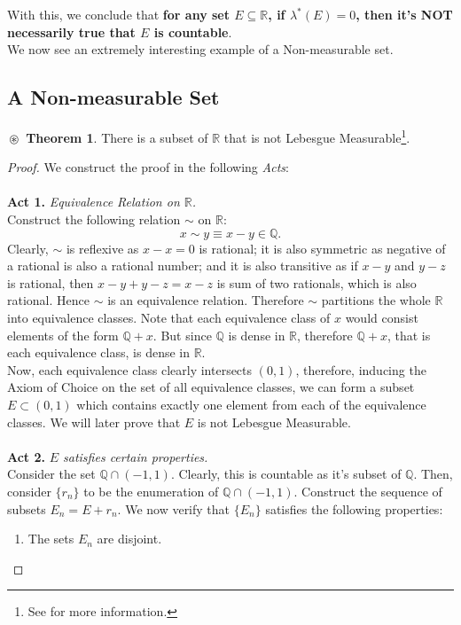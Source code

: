 \documentclass{article}
\theoremstyle{definition}
\newtheorem{theorem}{$\boxed{\boxed{\circledast}}$ Theorem}
\theoremstyle{remark}
\theoremstyle{definition}
\theoremstyle{definition}
\theoremstyle{definition}
\newcommand{\intrs}{\cap}
\newcommand{\R}{\mathbb{R}}
\newcommand{\Q}{\mathbb{Q}}
\newcommand{\lom}[1]{\lambda^*\left (#1\right )}
\begin{document}
With this, we conclude that \textbf{for any set $ E\subseteq \R $, if $ \lom{E} = 0 $, then it's NOT necessarily true that $ E $ is countable}.\\
We now see an extremely interesting example of a Non-measurable set.
\subsection{A Non-measurable Set}
\begin{theorem}
	 There is a subset of $ \R $ that is not Lebesgue Measurable\footnote{See \cite{Solovay70} for more information.}.
\end{theorem}
\begin{proof} We construct the proof in the following \emph{Acts}:\\\\
	\textbf{Act 1.} \emph{Equivalence Relation on $ \R $.}\\
	Construct the following relation $ \sim  $ on $ \R $:
	\[x\sim y \equiv x-y \in \Q.\]
	Clearly, $ \sim $ is reflexive as $ x - x = 0$ is rational; it is also symmetric as negative of a rational is also a rational number; and it is also transitive as if $x-y $ and $ y-z $ is rational, then $ x-y + y-z = x-z$ is sum of two rationals, which is also rational. Hence $ \sim $ is an equivalence relation. Therefore $ \sim $ partitions the whole $ \R $ into equivalence classes. Note that each equivalence class of $ x $ would consist elements of the form $ \Q + x$. But since $ \Q $ is dense in $ \R $, therefore $ \Q +x $, that is each equivalence class, is dense in $ \R $. \\
	Now, each equivalence class clearly intersects $ (0,1) $, therefore, inducing the Axiom of Choice on the set of all equivalence classes, we can form a subset $ E\subset (0,1) $ which contains exactly one element from each of the equivalence classes. We will later prove that $ E $ is not Lebesgue Measurable. \\\\
	\textbf{Act 2.} \emph{$ E $ satisfies certain properties.}\\
	Consider the set $ \Q \intrs (-1,1) $. Clearly, this is countable as it's subset of $ \Q $. Then, consider $ \{r_n\} $ to be the enumeration of $ \Q\intrs (-1,1) $. Construct the sequence of subsets $E_n = E + r_n $. We now verify that $ \{E_n\} $ satisfies the following properties:
	\begin{enumerate}
		\item {{The sets $ E_n $ are disjoint.}}

\end{enumerate}
\end{proof}
\end{document}

